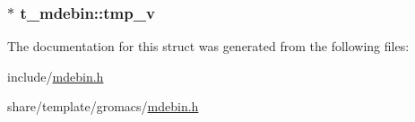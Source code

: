 \hypertarget{structt__mdebin_ae78018b9e72f3956c6d84e3b6d069229}{
\subsubsection[{tmp\-\_\-v}]{ $\ast$ {\bf t\-\_\-mdebin\-::tmp\-\_\-v}}}\label{structt__mdebin_ae78018b9e72f3956c6d84e3b6d069229}


\-The documentation for this struct was generated from the following files\-:\begin{DoxyCompactItemize}
\item 
include/\hyperlink{include_2mdebin_8h}{mdebin.\-h}\item 
share/template/gromacs/\hyperlink{share_2template_2gromacs_2mdebin_8h}{mdebin.\-h}\end{DoxyCompactItemize}
